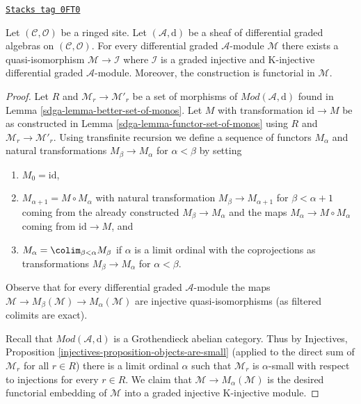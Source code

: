 \begin{theorem}
\label{sdga-theorem-qis-into-dg-injective}
\href{https://stacks.math.columbia.edu/tag/0FT0}{\texttt{Stacks tag 0FT0}}

Let $(\mathcal{C}, \mathcal{O})$ be a ringed site.
Let $(\mathcal{A}, \text{d})$
be a sheaf of differential graded algebras on $(\mathcal{C}, \mathcal{O})$.
For every differential graded $\mathcal{A}$-module $\mathcal{M}$ there
exists a quasi-isomorphism $\mathcal{M} \to \mathcal{I}$
where $\mathcal{I}$ is a graded injective and K-injective
differential graded $\mathcal{A}$-module. Moreover, the
construction is functorial in $\mathcal{M}$.
\end{theorem}

\begin{proof}

Let $R$ and $\mathcal{M}_r \to \mathcal{M}'_r$ be a set of
morphisms of $\textit{Mod}(\mathcal{A}, \text{d})$ found in
Lemma \ref{sdga-lemma-better-set-of-monos}.
Let $M$ with transformation $\text{id} \to M$
be as constructed in Lemma \ref{sdga-lemma-functor-set-of-monos}
using $R$ and $\mathcal{M}_r \to \mathcal{M}'_r$.
Using transfinite recursion we define a sequence of functors
$M_\alpha$ and natural transformations $M_\beta \to M_\alpha$
for $\alpha < \beta$ by setting
\begin{enumerate}
\item $M_0 = \text{id}$,
\item $M_{\alpha + 1} = M \circ M_\alpha$ with natural transformation
$M_\beta \to M_{\alpha + 1}$ for $\beta < \alpha + 1$
coming from the already constructed $M_\beta \to M_\alpha$ and the
maps $M_\alpha \to M \circ M_\alpha$ coming from $\text{id} \to M$, and
\item $M_\alpha = \colim_{\beta < \alpha} M_\beta$ if $\alpha$
is a limit ordinal with the coprojections as transformations
$M_\beta \to M_\alpha$ for $\alpha < \beta$.
\end{enumerate}
Observe that for every differential graded $\mathcal{A}$-module the maps
$\mathcal{M} \to M_\beta(\mathcal{M}) \to M_\alpha(\mathcal{M})$
are injective quasi-isomorphisms (as filtered colimits are exact).

\medskip\noindent
Recall that $\textit{Mod}(\mathcal{A}, \text{d})$ is a Grothendieck
abelian category. Thus by
Injectives, Proposition \ref{injectives-proposition-objects-are-small}
(applied to the direct sum of $\mathcal{M}_r$ for all $r \in R$)
there is a limit ordinal $\alpha$ such that $\mathcal{M}_r$ is $\alpha$-small
with respect to injections for every $r \in R$.
We claim that $\mathcal{M} \to M_\alpha(\mathcal{M})$ is
the desired functorial embedding of $\mathcal{M}$ into a
graded injective K-injective module.


\end{proof}
